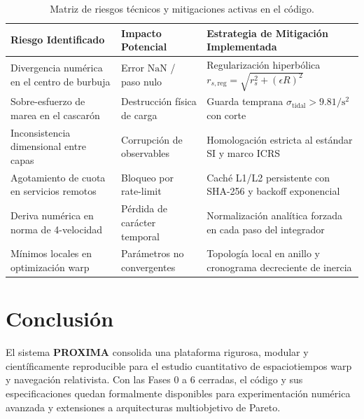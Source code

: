 \documentclass[11pt,a4paper]{article}
\begin{document}
\begin{table}[h!]
\centering
\small
\begin{tabular}{@{}lll@{}}
\toprule
\textbf{Riesgo Identificado} & \textbf{Impacto Potencial} & \textbf{Estrategia de Mitigación Implementada} \\ \midrule
Divergencia numérica en el centro de burbuja & Error $\text{NaN}$ / paso nulo & Regularización hiperbólica $r_{s,\text{reg}} = \sqrt{r_s^2 + (\epsilon R)^2}$ \\
Sobre-esfuerzo de marea en el cascarón & Destrucción física de carga & Guarda temprana $\sigma_{\text{tidal}} > 9.81\si{\per\second\squared}$ con corte \\
Inconsistencia dimensional entre capas & Corrupción de observables & Homologación estricta al estándar SI y marco ICRS \\
Agotamiento de cuota en servicios remotos & Bloqueo por rate-limit & Caché L1/L2 persistente con SHA-256 y backoff exponencial \\
Deriva numérica en norma de 4-velocidad & Pérdida de carácter temporal & Normalización analítica forzada en cada paso del integrador \\
Mínimos locales en optimización warp & Parámetros no convergentes & Topología local en anillo y cronograma decreciente de inercia \\ \bottomrule
\end{tabular}
\caption{Matriz de riesgos técnicos y mitigaciones activas en el código.}
\end{table}

\section{Conclusión}
El sistema \textbf{PROXIMA} consolida una plataforma rigurosa, modular y científicamente reproducible para el estudio cuantitativo de espaciotiempos warp y navegación relativista. Con las Fases 0 a 6 cerradas, el código y sus especificaciones quedan formalmente disponibles para experimentación numérica avanzada y extensiones a arquitecturas multiobjetivo de Pareto.
\end{document}
